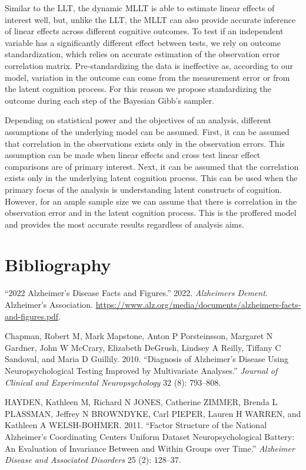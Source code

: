 \documentclass[
]{article}
\newlength{\cslhangindent}
\newlength{\cslentryspacingunit} %
\newenvironment{CSLReferences}[2] %
 {%
  \setlength{\parindent}{0pt}
  \ifodd #1
  \let\oldpar\par
  \def\par{\hangindent=\cslhangindent\oldpar}
  \fi
  \setlength{\parskip}{#2\cslentryspacingunit}
 }%
 {}
\begin{document}
Similar to the LLT, the dynamic MLLT is able to estimate linear effects of interest well, but, unlike the LLT, the MLLT can also provide accurate inference of linear effects across different cognitive outcomes. To test if an independent variable has a significantly different effect between tests, we rely on outcome standardization, which relies on accurate estimation of the observation error correlation matrix. Pre-standardizing the data is ineffective as, according to our model, variation in the outcome can come from the measurement error or from the latent cognition process. For this reason we propose standardizing the outcome during each step of the Bayesian Gibb's sampler.

Depending on statistical power and the objectives of an analysis, different assumptions of the underlying model can be assumed. First, it can be assumed that correlation in the observations exists only in the observation errors. This assumption can be made when linear effects and cross test linear effect comparisons are of primary interest. Next, it can be assumed that the correlation exists only in the underlying latent cognition process. This can be used when the primary focus of the analysis is understanding latent constructs of cognition. However, for an ample sample size we can assume that there is correlation in the observation error and in the latent cognition process. This is the proffered model and provides the most accurate results regardless of analysis aims.

\newpage{}

\hypertarget{bibliography}{%
\section*{Bibliography}\label{bibliography}}

\hypertarget{refs}{}
\begin{CSLReferences}{1}{0}
\leavevmode{}%
{``2022 Alzheimer's Disease Facts and Figures.''} 2022. \emph{Alzheimers Dement}. Alzheimer's Association. \url{https://www.alz.org/media/documents/alzheimers-facts-and-figures.pdf}.

\leavevmode{}%
Chapman, Robert M, Mark Mapstone, Anton P Porsteinsson, Margaret N Gardner, John W McCrary, Elizabeth DeGrush, Lindsey A Reilly, Tiffany C Sandoval, and Maria D Guillily. 2010. {``Diagnosis of Alzheimer's Disease Using Neuropsychological Testing Improved by Multivariate Analyses.''} \emph{Journal of Clinical and Experimental Neuropsychology} 32 (8): 793--808.

\leavevmode{}%
HAYDEN, Kathleen M, Richard N JONES, Catherine ZIMMER, Brenda L PLASSMAN, Jeffrey N BROWNDYKE, Carl PIEPER, Lauren H WARREN, and Kathleen A WELSH-BOHMER. 2011. {``Factor Structure of the National Alzheimer's Coordinating Centers Uniform Dataset Neuropsychological Battery: An Evaluation of Invariance Between and Within Groups over Time.''} \emph{Alzheimer Disease and Associated Disorders} 25 (2): 128--37.

\end{CSLReferences}
\end{document}
